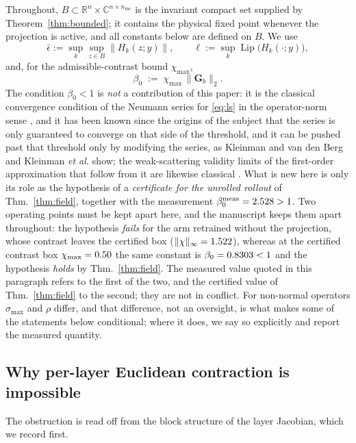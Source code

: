\documentclass[journal,cmes,article,submit,moreauthors,pdftex]{Definitions/tsp}
\newcommand{\R}{\mathbb{R}}
\newcommand{\C}{\mathbb{C}}
\newcommand{\norm}[1]{\lVert #1 \rVert}
\newcommand{\infn}[1]{\lVert #1 \rVert_{\infty}}
\newcommand{\numv}[1]{#1}
\begin{document}
Throughout, $B\subset\R^n\times\C^{n\times n_{\mathrm{inc}}}$ is the invariant compact set supplied
by Theorem~\ref{thm:bounded}; it contains the physical fixed point whenever the projection is
active, and all constants below are defined on $B$. We use
\begin{equation}\label{eq:budgets}
\bar\epsilon := \sup_{k}\sup_{z\in B}\norm{H_k(z;y)},\qquad
\ell := \sup_k \operatorname{Lip}\big(H_k(\cdot;y)\big),
\end{equation}
and, for the admissible-contrast bound $\chi_{\max}$,
\begin{equation}\label{eq:beta0}
\beta_0 \;:=\; \chi_{\max}\,\norm{\mathbf{G}_b}_2 .
\end{equation}
The condition $\beta_0<1$ is \emph{not} a contribution of this paper: it is the classical
convergence condition of the Neumann series for \eqref{eq:ls} in the operator-norm sense \cite{born_lit},
and it has been known since the origins of the subject that the series is only guaranteed to
converge on that side of the threshold, and it can be pushed past that threshold only by modifying the
series, as Kleinman and van den Berg \cite{kleinvandenberg} and Kleinman \emph{et al.}
\cite{convergentborn} show; the weak-scattering validity limits of the
first-order approximation that follow from it are likewise classical \cite{slaney}.
What is new here is only its role as the hypothesis of a \emph{certificate for the unrolled
rollout} of Thm.~\ref{thm:field}, together with the measurement
$\beta_0^{\mathrm{meas}}=\numv{\NumBetaMeas}>1$. Two operating points must be kept apart here,
and the manuscript keeps them apart throughout: the hypothesis \emph{fails} for the arm
retrained without the projection, whose contrast leaves the certified box
($\infn{\chi}=\numv{\NumAblUncPOffFbOnChi}$), whereas
at the certified contrast box $\chi_{\max}=\numv{\chimax}$ the same constant is
$\beta_0=\numv{\betacert}<1$ and the hypothesis \emph{holds} by Thm.~\ref{thm:field}. The
measured value quoted in this paragraph refers to the first of the two, and the certified value
of Thm.~\ref{thm:field} to the second; they are not in conflict.
For non-normal operators $\sigma_{\max}$ and $\rho$ differ, and that difference, not an
oversight, is what makes some of the statements below conditional; where it does, we say so
explicitly and report the measured quantity.

\subsection{Why per-layer Euclidean contraction is impossible}
The obstruction is read off from the block structure of the layer Jacobian, which we record first.
\end{document}
